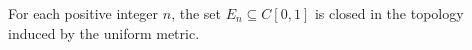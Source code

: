 For each positive integer $n$, the set $E_n \subseteq C[0,1]$ is closed in the topology induced by the uniform metric.
